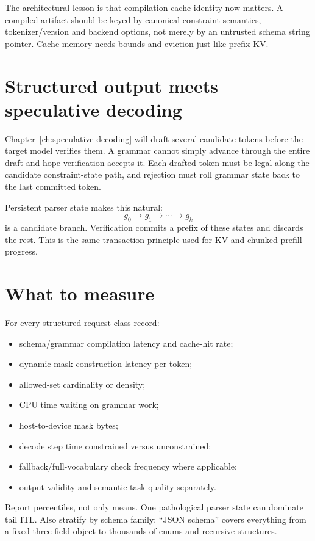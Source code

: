 The architectural lesson is that compilation cache identity now matters. A compiled
artifact should be keyed by canonical constraint semantics, tokenizer/version and
backend options, not merely by an untrusted schema string pointer. Cache memory needs
bounds and eviction just like prefix KV.

\section{Structured output meets speculative decoding}

Chapter~\ref{ch:speculative-decoding} will draft several candidate tokens before the
target model verifies them. A grammar cannot simply advance through the entire draft
and hope verification accepts it. Each drafted token must be legal along the candidate
constraint-state path, and rejection must roll grammar state back to the last committed
token.

Persistent parser state makes this natural:
\[
g_0\rightarrow g_1\rightarrow\cdots\rightarrow g_k
\]
is a candidate branch. Verification commits a prefix of these states and discards the
rest. This is the same transaction principle used for KV and chunked-prefill progress.

\section{What to measure}

For every structured request class record:
\begin{itemize}
\item schema/grammar compilation latency and cache-hit rate;
\item dynamic mask-construction latency per token;
\item allowed-set cardinality or density;
\item CPU time waiting on grammar work;
\item host-to-device mask bytes;
\item decode step time constrained versus unconstrained;
\item fallback/full-vocabulary check frequency where applicable;
\item output validity and semantic task quality separately.
\end{itemize}

Report percentiles, not only means. One pathological parser state can dominate tail
ITL. Also stratify by schema family: ``JSON schema'' covers everything from a fixed
three-field object to thousands of enums and recursive structures.

